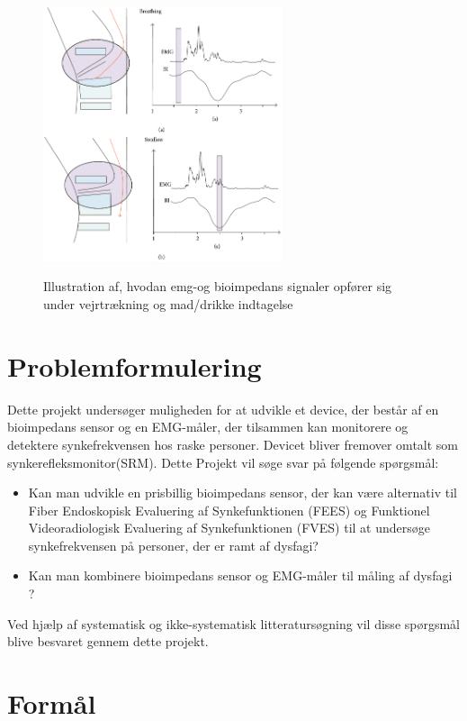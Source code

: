 \begin{figure}[H]
\centering
{\includegraphics[width=7cm]
{Figure/EMGBIGraph}}
\caption{Illustration af, hvodan emg-og bioimpedans signaler opfører sig under vejrtrækning og mad/drikke indtagelse\cite{Schultheiss2014}}
\label{EMGBIGraph} 
\end{figure}

\section{Problemformulering}

Dette projekt undersøger muligheden for at udvikle et device, der består af en bioimpedans sensor og en EMG-måler, der tilsammen kan monitorere og detektere synkefrekvensen hos raske personer. Devicet bliver fremover omtalt som synkerefleksmonitor(SRM). Dette Projekt vil søge svar på følgende spørgsmål: 

\begin{itemize}
\item Kan man udvikle en prisbillig bioimpedans sensor, der kan være alternativ til Fiber Endoskopisk Evaluering af Synkefunktionen (FEES) og Funktionel Videoradiologisk Evaluering af Synkefunktionen (FVES) til at undersøge synkefrekvensen på personer, der er ramt af dysfagi?
\item Kan man kombinere bioimpedans sensor og EMG-måler til måling af dysfagi ?


\end{itemize}
Ved hjælp af systematisk og ikke-systematisk litteratursøgning vil disse spørgsmål blive besvaret gennem dette projekt. 

\section{Formål}

